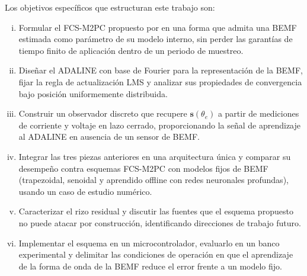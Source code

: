 \documentclass[../../../Tesis_JALS_Maestria.tex]{subfiles}
\begin{document}
\noindent Los objetivos específicos que estructuran este trabajo son:
\begin{enumerate}[i)]
    \item Formular el FCS-M2PC propuesto por \citet{coronado2025} en una forma que admita una BEMF estimada como parámetro de su modelo interno, sin perder las garantías de tiempo finito de aplicación dentro de un periodo de muestreo.
    \item Diseñar el ADALINE con base de Fourier para la representación de la BEMF, fijar la regla de actualización LMS y analizar sus propiedades de convergencia bajo posición uniformemente distribuida.
    \item Construir un observador discreto que recupere $\mathbf{s}(\theta_e)$ a partir de mediciones de corriente y voltaje en lazo cerrado, proporcionando la señal de aprendizaje al ADALINE en ausencia de un sensor de BEMF.
    \item Integrar las tres piezas anteriores en una arquitectura única y comparar su desempeño contra esquemas FCS-M2PC con modelos fijos de BEMF (trapezoidal, senoidal y aprendido offline con redes neuronales profundas), usando un caso de estudio numérico.
    \item Caracterizar el rizo residual y discutir las fuentes que el esquema propuesto no puede atacar por construcción, identificando direcciones de trabajo futuro.
    \item Implementar el esquema en un microcontrolador, evaluarlo en un banco experimental y delimitar las condiciones de operación en que el aprendizaje de la forma de onda de la BEMF reduce el error frente a un modelo fijo.
\end{enumerate}
\end{document}
